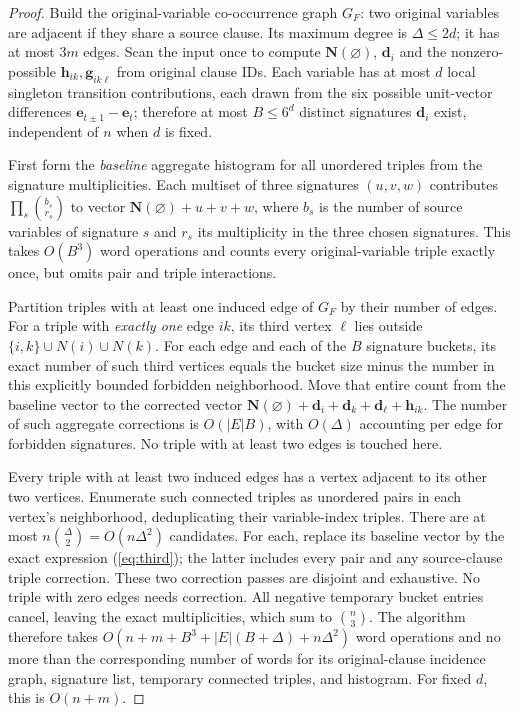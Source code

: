 \documentclass[11pt]{article}
\newcommand{\vv}[1]{\boldsymbol{#1}}
\begin{document}
\begin{proof}
Build the original-variable co-occurrence graph $G_F$: two original variables are adjacent if they share a source clause. Its maximum degree is $\Delta\le2d$; it has at most $3m$ edges. Scan the input once to compute $\vv N(\varnothing)$, $\vv d_i$ and the nonzero-possible $\vv h_{ik},\vv g_{ik\ell}$ from original clause IDs. Each variable has at most $d$ local singleton transition contributions, each drawn from the six possible unit-vector differences $\vv e_{t\pm1}-\vv e_t$; therefore at most $B\le6^d$ distinct signatures $\vv d_i$ exist, independent of $n$ when $d$ is fixed.

First form the \emph{baseline} aggregate histogram for all unordered triples from the signature multiplicities. Each multiset of three signatures $(u,v,w)$ contributes $\prod_s \binom{b_s}{r_s}$ to vector $\vv N(\varnothing)+u+v+w$, where $b_s$ is the number of source variables of signature $s$ and $r_s$ its multiplicity in the three chosen signatures. This takes $O(B^3)$ word operations and counts every original-variable triple exactly once, but omits pair and triple interactions.

Partition triples with at least one induced edge of $G_F$ by their number of edges. For a triple with \emph{exactly one} edge $ik$, its third vertex $\ell$ lies outside $\{i,k\}\cup N(i)\cup N(k)$. For each edge and each of the $B$ signature buckets, its exact number of such third vertices equals the bucket size minus the number in this explicitly bounded forbidden neighborhood. Move that entire count from the baseline vector to the corrected vector $\vv N(\varnothing)+\vv d_i+\vv d_k+\vv d_\ell+\vv h_{ik}$. The number of such aggregate corrections is $O(|E|B)$, with $O(\Delta)$ accounting per edge for forbidden signatures. No triple with at least two edges is touched here.

Every triple with at least two induced edges has a vertex adjacent to its other two vertices. Enumerate such connected triples as unordered pairs in each vertex's neighborhood, deduplicating their variable-index triples. There are at most $n\binom\Delta2=O(n\Delta^2)$ candidates. For each, replace its baseline vector by the exact expression (\ref{eq:third}); the latter includes every pair and any source-clause triple correction. These two correction passes are disjoint and exhaustive. No triple with zero edges needs correction. All negative temporary bucket entries cancel, leaving the exact multiplicities, which sum to $\binom n3$. The algorithm therefore takes $O(n+m+B^3+|E|(B+\Delta)+n\Delta^2)$ word operations and no more than the corresponding number of words for its original-clause incidence graph, signature list, temporary connected triples, and histogram. For fixed $d$, this is $O(n+m)$.
\end{proof}
\end{document}
